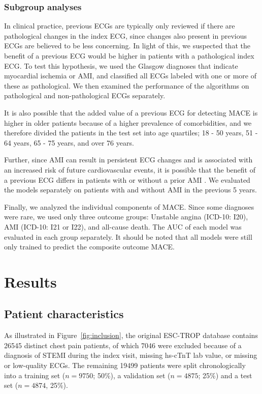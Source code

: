 \documentclass[preprint]{elsarticle}
\begin{document}
\subsubsection{Subgroup analyses}
In clinical practice, previous ECGs are typically only reviewed if there are pathological changes in the index ECG, since changes also present in previous ECGs are believed to be less concerning. In light of this, we suspected that the benefit of a previous ECG would be higher in patients with a pathological index ECG. To test this hypothesis, we used the Glasgow diagnoses that indicate myocardial ischemia or AMI, and classified all ECGs labeled with one or more of these as pathological. We then examined the performance of the algorithms on pathological and non-pathological ECGs separately.

It is also possible that the added value of a previous ECG for detecting MACE is higher in older patients because of a higher prevalence of comorbidities, and we therefore divided the patients in the test set into age quartiles; 18 - 50 years, 51 - 64 years, 65 - 75 years, and over 76 years.

Further, since AMI can result in persistent ECG changes and is associated with an increased risk of future cardiovascular events, it is possible that the benefit of a previous ECG differs in patients with or without a prior AMI \citep{strom2007,sawai2017}. We evaluated the models separately on patients with and without AMI in the previous 5 years.

Finally, we analyzed the individual components of MACE. Since some diagnoses were rare, we used only three outcome groups: Unstable angina (ICD-10: I20), AMI (ICD-10: I21 or I22), and all-cause death. The AUC of each model was evaluated in each group separately. It should be noted that all models were still only trained to predict the composite outcome MACE.

\section{Results}
\subsection{Patient characteristics}
\label{sec:patient_characteristics}
As illustrated in Figure~\ref{fig:inclusion}, the original ESC-TROP database contains 26545 distinct chest pain patients, of which 7046 were excluded because of a diagnosis of STEMI during the index visit, missing hs-cTnT lab value, or missing or low-quality ECGs. The remaining 19499 patients were split chronologically into a training set ($n=9750$; 50\%), a validation set ($n=4875$; 25\%) and a test set ($n=4874$, 25\%).
\end{document}

